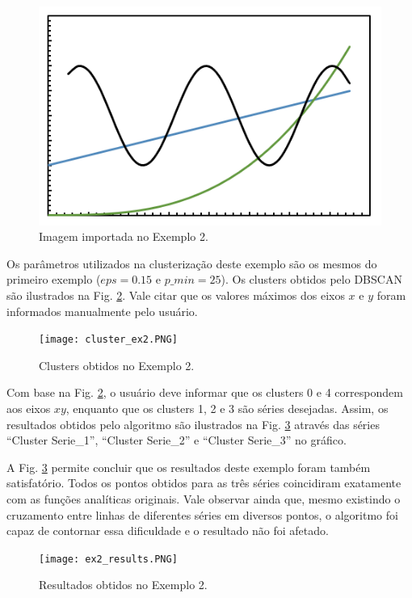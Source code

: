 \documentclass{article}
\begin{document}
    \begin{figure}[h]
        \centering
        \includegraphics[scale=0.5]{t4.PNG}
        \caption{Imagem importada no Exemplo 2.}
        \label{fig:ex2_1}
    \end{figure}
    
    Os parâmetros utilizados na clusterização deste exemplo são os mesmos do primeiro exemplo ($eps=0.15$ e $p\_min=25$). Os clusters obtidos pelo DBSCAN são ilustrados na Fig. \ref{fig:ex2_2}. Vale citar que os valores máximos dos eixos $x$ e $y$ foram informados manualmente pelo usuário.
    
    \begin{figure}[h]
        \centering
        \texttt{[image: cluster\_ex2.PNG]}
        \caption{Clusters obtidos no Exemplo 2.}
        \label{fig:ex2_2}
    \end{figure}
    
    Com base na Fig. \ref{fig:ex2_2}, o usuário deve informar que os clusters 0 e 4 correspondem aos eixos $xy$, enquanto que os clusters 1, 2 e 3 são séries desejadas. Assim, os resultados obtidos pelo algoritmo são ilustrados na Fig. \ref{fig:ex2_3} através das séries ``Cluster Serie\_1'', ``Cluster Serie\_2'' e ``Cluster Serie\_3'' no gráfico.
    
    A Fig. \ref{fig:ex2_3} permite concluir que os resultados deste exemplo foram também satisfatório. Todos os pontos obtidos para as três séries coincidiram exatamente com as funções analíticas originais. Vale observar ainda que, mesmo existindo o cruzamento entre linhas de diferentes séries em diversos pontos, o algoritmo foi capaz de contornar essa dificuldade e o resultado não foi afetado.
    
    \begin{figure}[h]
        \centering
        \texttt{[image: ex2\_results.PNG]}
        \caption{Resultados obtidos no Exemplo 2.}
        \label{fig:ex2_3}
    \end{figure}
    
\end{document}
